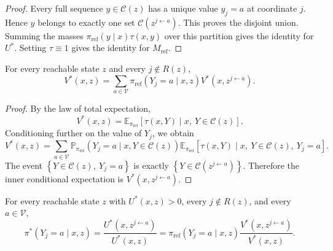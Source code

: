 \documentclass{article}
\numberwithin{theorem}{section}
\numberwithin{proposition}{section}
\numberwithin{corollary}{section}
\numberwithin{lemma}{section}
\numberwithin{conjecture}{section}
\numberwithin{remark}{section}
\numberwithin{definition}{section}
\numberwithin{assumption}{section}
\numberwithin{example}{section}
\newcommand{\calC}{{\mathcal{C}}}
\newcommand{\calV}{{\mathcal{V}}}
\newcommand{\bbE}{\mathbb{E}}
\newcommand{\bbP}{\mathbb{P}}
\newcommand{\lbra}[1]{\left[#1\right]}
\newcommand{\mbra}[1]{\left\{#1\right\}}
\providecommand{\base}{\pi_{\mathrm{ref}}}
\begin{document}
\begin{proof}
Every full sequence $y\in\calC(z)$ has a unique value $y_j=a$ at coordinate $j$. Hence $y$ belongs to exactly one set $\calC(z^{j\leftarrow a})$. This proves the disjoint union. Summing the masses $\base(y\mid x)\tau(x,y)$ over this partition gives the identity for $U^*$. Setting $\tau\equiv 1$ gives the identity for $M_{\text{ref}}$.
\end{proof}

\begin{proposition}
\label{prop:aoar_bellman}
For every reachable state $z$ and every $j\notin R(z)$,
\begin{equation*}
    V^*(x,z) = \sum_{a\in\calV} \base(Y_j=a\mid x,z) V^*(x,z^{j\leftarrow a}).
\end{equation*}
\end{proposition}

\begin{proof}
By the law of total expectation,
\begin{equation*}
    V^*(x,z) = \bbE_{\base} \lbra{ \tau(x,Y) \mid x,\ Y\in\calC(z) }.
\end{equation*}
Conditioning further on the value of $Y_j$, we obtain
\begin{equation*}
    V^*(x,z) = \sum_{a\in\calV} \bbP_{\base}(Y_j=a\mid x, Y \in \calC(z)) \bbE_{\base} \lbra{ \tau(x,Y) \mid x,\ Y\in\calC(z),\ Y_j=a }.
\end{equation*}
The event $\mbra{Y\in\calC(z),\ Y_j=a}$ is exactly $\mbra{Y\in\calC(z^{j\leftarrow a})}$. Therefore the inner conditional expectation is $V^*(x,z^{j\leftarrow a})$.
\end{proof}

\begin{proposition}
\label{prop:aoar_exact_target_conditional}
For every reachable state $z$ with $U^* (x,z)>0$, every $j\notin R(z)$, and every $a\in\calV$,
\begin{equation*}
    \pi^*(Y_j=a\mid x,z) = \frac{U^*(x,z^{j\leftarrow a})}{U^*(x,z)} = \base(Y_j=a\mid x,z) \frac{V^*(x,z^{j\leftarrow a})}{V^*(x,z)}.
\end{equation*}
\end{proposition}
\end{document}
